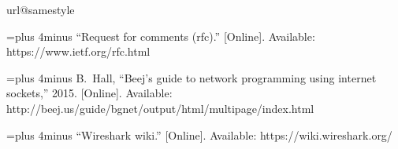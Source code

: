 \documentclass[11pt,a4paper,reqno]{report}
\numberwithin{equation}{section}
\begin{document}
\begin{thebibliography}{1}
	
\providecommand{\url}[1]{#1}
\csname url@samestyle\endcsname
\providecommand{\newblock}{\relax}
\providecommand{\bibinfo}[2]{#2}
\providecommand{\BIBentrySTDinterwordspacing}{\spaceskip=0pt\relax}
\providecommand{\BIBentryALTinterwordstretchfactor}{4}
\providecommand{\BIBentryALTinterwordspacing}{\spaceskip=\fontdimen2\font plus
\BIBentryALTinterwordstretchfactor\fontdimen3\font minus
  \fontdimen4\font\relax}
\providecommand{\BIBforeignlanguage}[2]{{%
\expandafter\ifx\csname l@#1\endcsname\relax
\typeout{** WARNING: IEEEtran.bst: No hyphenation pattern has been}%
\typeout{** loaded for the language `#1'. Using the pattern for}%
\typeout{** the default language instead.}%
\else
\language=\csname l@#1\endcsname
\fi
#2}}
\providecommand{\BIBdecl}{\relax}
\BIBdecl

\BIBentryALTinterwordspacing
``Request for comments (rfc).'' [Online]. Available:
  \url{https://www.ietf.org/rfc.html}
\BIBentrySTDinterwordspacing

\BIBentryALTinterwordspacing
B.~Hall, ``Beej's guide to network programming using internet sockets,'' 2015.
  [Online]. Available:
  \url{http://beej.us/guide/bgnet/output/html/multipage/index.html}
\BIBentrySTDinterwordspacing

\BIBentryALTinterwordspacing
``Wireshark wiki.'' [Online]. Available: \url{https://wiki.wireshark.org/}
\BIBentrySTDinterwordspacing

\end{thebibliography}
\end{document}
